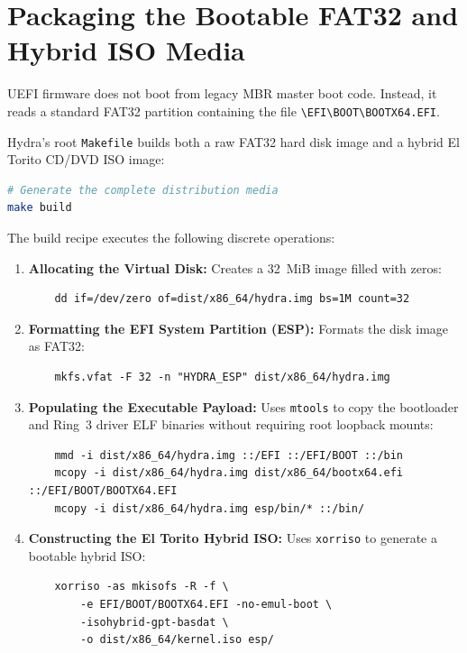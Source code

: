 \section{Packaging the Bootable FAT32 and Hybrid ISO Media}
\label{sec:packaging_deep}

UEFI firmware does not boot from legacy MBR master boot code. Instead, it reads a standard FAT32 partition containing the file \texttt{\textbackslash EFI\textbackslash BOOT\textbackslash BOOTX64.EFI}.

Hydra's root \texttt{Makefile} builds both a raw FAT32 hard disk image and a hybrid El Torito CD/DVD ISO image:

\begin{lstlisting}[language=bash, caption={Building the Bootable Media Pipeline}]
# Generate the complete distribution media
make build
\end{lstlisting}

The build recipe executes the following discrete operations:
\begin{enumerate}
    \item \textbf{Allocating the Virtual Disk:} Creates a 32~MiB image filled with zeros:
    \begin{verbatim}
    dd if=/dev/zero of=dist/x86_64/hydra.img bs=1M count=32
    \end{verbatim}
    \item \textbf{Formatting the EFI System Partition (ESP):} Formats the disk image as FAT32:
    \begin{verbatim}
    mkfs.vfat -F 32 -n "HYDRA_ESP" dist/x86_64/hydra.img
    \end{verbatim}
    \item \textbf{Populating the Executable Payload:} Uses \texttt{mtools} to copy the bootloader and Ring~3 driver ELF binaries without requiring root loopback mounts:
    \begin{verbatim}
    mmd -i dist/x86_64/hydra.img ::/EFI ::/EFI/BOOT ::/bin
    mcopy -i dist/x86_64/hydra.img dist/x86_64/bootx64.efi ::/EFI/BOOT/BOOTX64.EFI
    mcopy -i dist/x86_64/hydra.img esp/bin/* ::/bin/
    \end{verbatim}
    \item \textbf{Constructing the El Torito Hybrid ISO:} Uses \texttt{xorriso} to generate a bootable hybrid ISO:
    \begin{verbatim}
    xorriso -as mkisofs -R -f \
        -e EFI/BOOT/BOOTX64.EFI -no-emul-boot \
        -isohybrid-gpt-basdat \
        -o dist/x86_64/kernel.iso esp/
    \end{verbatim}
\end{enumerate}

